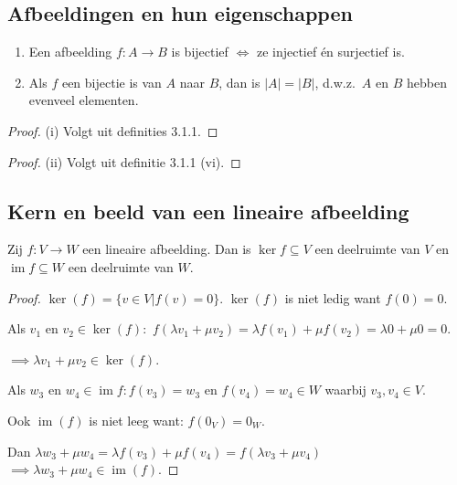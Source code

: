 \subsection{Afbeeldingen en hun eigenschappen}

\begin{lemma}[3.1.3]
    \begin{enumerate}
        \item[(i)] Een afbeelding $f \colon A \to B$ is bijectief \(\iff\) ze injectief én surjectief is.
        \item[(ii)] Als $f$ een bijectie is van $A$ naar $B$, dan is $|A| = |B|$, d.w.z.\ $A$ en $B$ hebben evenveel elementen.
    \end{enumerate}
\end{lemma}
\begin{proof}(i)
    Volgt uit definities 3.1.1.
\end{proof}
\begin{proof}(ii)
    Volgt uit definitie 3.1.1 (vi).
\end{proof}
\subsection{Kern en beeld van een lineaire afbeelding}

\begin{lemma}[3.2.2]
    Zij $f \colon V \to W$ een lineaire afbeelding. Dan is $\ker f \subseteq V$ een deelruimte van $V$ en $\operatorname{im} f \subseteq W$ een deelruimte van $W$.
\end{lemma}
\begin{proof}
    \(\ker (f) = \{ v \in V |f(v) = 0\}. \)
    \(\ker (f)\) is niet ledig want \(f(0) = 0\).

    Als \(v_1\) en \(v_2 \in \ker (f):\)
    \(f(\lambda v_1 + \mu v_2) = \lambda f( v_1) + \mu f( v_2)
    = \lambda 0 + \mu 0
    = 0\).

    \(\implies \lambda v_1 + \mu v_2 \in \ker (f)\).

    Als \(w_3\) en \(w_4 \in \operatorname{im} f: f(v_3) = w_3\) en \(f(v_4) = w_4 \in W\)
    waarbij \(v_3,v_4 \in V\).

    Ook \(\operatorname{im}(f)\) is niet leeg want: \(f(0_V) = 0_W\).

    Dan
    \(\lambda w_3 + \mu w_4
    = \lambda f( v_3) + \mu f( v_4)
    =f(\lambda v_3 + \mu v_4) \)
    \(\implies \lambda w_3 + \mu w_4  \in \operatorname{im}(f) \).
\end{proof}

